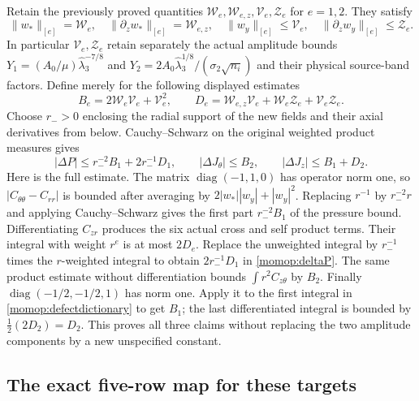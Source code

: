 Retain the previously proved quantities
$\mathcal W_e,\mathcal W_{e,z},\mathcal V_e,\mathcal Z_e$ for
$e=1,2$. They satisfy
\[
 \|w_*\|_{[e]}=\mathcal W_e,\quad
 \|\partial_zw_*\|_{[e]}=\mathcal W_{e,z},\quad
 \|w_y\|_{[e]}\le\mathcal V_e,\quad
 \|\partial_zw_y\|_{[e]}\le\mathcal Z_e.
\]
In particular $\mathcal V_e,\mathcal Z_e$ retain separately the
actual amplitude bounds
$Y_1=(A_0/\mu)\widehat\lambda_3^{-7/8}$ and
$Y_2=2A_0\widehat\lambda_3^{1/8}/(\sigma_2\sqrt{n_i})$
and their physical source-band factors. Define merely for the
following displayed estimates
\[
 B_e=2\mathcal W_e\mathcal V_e+\mathcal V_e^2,\qquad
 D_e=\mathcal W_{e,z}\mathcal V_e+
                    \mathcal W_e\mathcal Z_e+\mathcal V_e\mathcal Z_e.
\]
Choose $r_->0$ enclosing the radial support of the new fields and
their axial derivatives from below. Cauchy--Schwarz on the original
weighted product measures gives
\begin{equation}\label{momop:targetbounds}
 |\Delta P|\le r_-^{-2}B_1+2r_-^{-1}D_1,\qquad
 |\Delta J_\theta|\le B_2,\qquad
 |\Delta J_z|\le B_1+D_2.
\end{equation}
Here is the full estimate. The matrix
$\operatorname{diag}(-1,1,0)$ has operator norm one, so
$|C_{\theta\theta}-C_{rr}|$ is bounded after averaging by
$2|w_*||w_y|+|w_y|^2$. Replacing $r^{-1}$ by
$r_-^{-2}r$ and applying Cauchy--Schwarz gives the first part
$r_-^{-2}B_1$ of the pressure bound. Differentiating $C_{zr}$
produces the six actual cross and self product terms. Their integral
with weight $r^e$ is at most $2D_e$. Replace the unweighted
integral by $r_-^{-1}$ times the $r$-weighted integral to obtain
$2r_-^{-1}D_1$ in \eqref{momop:deltaP}.
The same product estimate without differentiation bounds
$\int r^2C_{z\theta}$ by $B_2$.
Finally $\operatorname{diag}(-1/2,-1/2,1)$ has norm one.
Apply it to the first integral in \eqref{momop:defectdictionary}
to get $B_1$; the last differentiated integral is bounded by
$\tfrac12(2D_2)=D_2$. This proves all three claims without
replacing the two amplitude components by a new unspecified constant.

\subsection{The exact five-row map for these targets}

